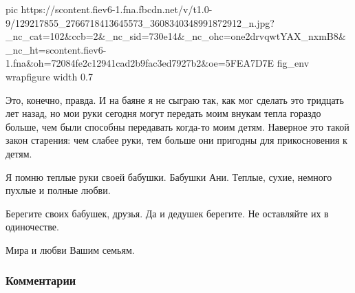 \ifcmt
pic https://scontent.fiev6-1.fna.fbcdn.net/v/t1.0-9/129217855_2766718413645573_3608340348991872912_n.jpg?_nc_cat=102&ccb=2&_nc_sid=730e14&_nc_ohc=one2drvqwtYAX_nxmB8&_nc_ht=scontent.fiev6-1.fna&oh=72084fe2c12941cad2b9fac3ed7927b2&oe=5FEA7D7E
fig_env wrapfigure
width 0.7
\fi

Это, конечно, правда. И на баяне я не сыграю так, как мог сделать это тридцать
лет назад, но мои руки сегодня могут передать моим внукам тепла гораздо больше,
чем были способны передавать когда-то моим детям. Наверное это такой закон
старения: чем слабее руки, тем больше они пригодны для прикосновения к детям.

Я помню теплые руки своей бабушки. Бабушки Ани. Теплые, сухие, немного пухлые и
полные любви. 

Берегите своих бабушек, друзья. Да и дедушек берегите. Не оставляйте их в
одиночестве. 

Мира и любви Вашим семьям.

\subsubsection{Комментарии}

